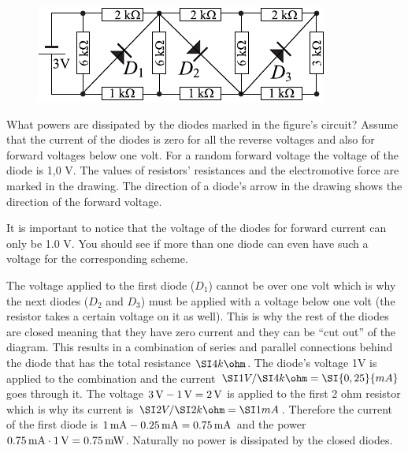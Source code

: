 \begin{figure}
\includegraphics[width=\linewidth]{2012-lahg-08-dioodid}
\end{figure}
What powers are dissipated by the diodes marked in the figure’s circuit? Assume that the current of the diodes is zero for all the reverse voltages and also for forward voltages below one volt. For a random forward voltage the voltage of the diode is 1,0 V. The values of resistors’ resistances and the electromotive force are marked in the drawing. The direction of a diode’s arrow in the drawing shows the direction of the forward voltage.

\hinteng
It is important to notice that the voltage of the diodes for forward current can only be 1.0 V. You should see if more than one diode can even have such a voltage for the corresponding scheme.

\solueng
The voltage applied to the first diode ($D_1$) cannot be over one volt which is why the next diodes ($D_2$ and $D_3$) must be applied with a voltage below one volt (the resistor takes a certain voltage on it as well). This is why the rest of the diodes are closed meaning that they have zero current and they can be “cut out” of the diagram. This results in a combination of series and parallel connections behind the diode that has the total resistance $\SI 4{k\ohm}$. The diode’s voltage 1V is applied to the combination and the current $\SI 1V /\SI 4{k\ohm}= \SI {0,25}{mA}$ goes through it. The voltage $\SI 3V-\SI 1V=\SI 2V$ is applied to the first 2 ohm resistor which is why its current is $\SI 2V/\SI 2{k\ohm}=\SI 1{mA}$. Therefore the current of the first diode is $\SI 1{mA}-\SI {0,25}{mA}=\SI{0,75}{mA}$ and the power $\SI{0,75}{mA}\cdot \SI 1V=\SI{0,75}{mW}$. Naturally no power is dissipated by the closed diodes.
\probend